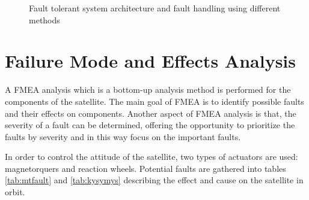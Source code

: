 \begin{figure}[H]
\begin{minipage}[b]{0.49\linewidth}
\begin{figure}[H]
		\end{figure}
	\end{minipage}
			\caption{Fault tolerant system architecture and fault handling using different methods \cite{FTJ}}
				\label{fig:1}
\end{figure}

\section{Failure Mode and Effects Analysis}
A FMEA analysis which is a bottom-up analysis method is performed for the components of the satellite. The main goal of FMEA is to identify possible faults and their effects on components. Another aspect of FMEA analysis is that, the severity of a fault can be determined, offering the opportunity to prioritize the faults by severity and in this way focus on the important faults.

In order to control the attitude of the satellite, two types of actuators are used: magnetorquers and reaction wheels. Potential faults are gathered into tables \ref{tab:mtfault} and \ref{tab:kysymys} describing the effect and cause on the satellite in orbit.

